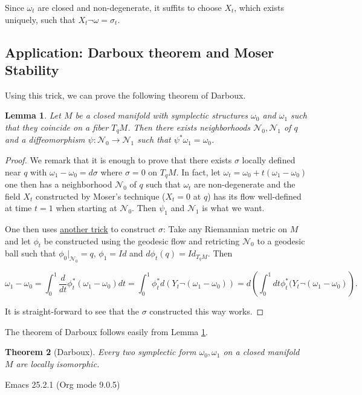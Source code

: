 \documentclass[11pt]{article}
\newtheorem{theorem}{Theorem}
\newtheorem{lemma}[theorem]{Lemma}
\begin{document}
Since \(\omega_t\) are closed and non-degenerate, it suffits to choose \(X_t\), which exists
uniquely, such that \(X_t \neg \omega = \sigma_t\).

\subsection{Application: Darboux theorem and Moser Stability}
\label{sec:orgb93185e}
Using this trick, we can prove the following theorem of Darboux.

\begin{lemma}
\label{lem1}
Let \(M\) be a closed manifold with symplectic structures \(\omega_0\) and \(\omega_1\) such
that they coincide on a fiber \(T_qM\). Then there exists neighborhoods \(\mathcal{N}_0,
\mathcal{N}_1\) of \(q\) and a diffeomorphism \(\psi: \mathcal{N}_0 \longrightarrow
\mathcal{N}_1\) such that \(\psi^* \omega_1 = \omega_0\). 
\end{lemma}


\begin{proof}
We remark that it is enough to prove that there exists \(\sigma\) locally defined near \(q\)
with \(\omega_1 -\omega_0 = d\sigma\) where \(\sigma = 0\) on \(T_qM\). In fact, let \(\omega_t =
\omega_0 + t(\omega_1 - \omega_0)\) one then has a neighborhood \(\mathcal{N}_0\) of \(q\)
such that \(\omega_t\) are non-degenerate and the field \(X_t\) constructed by Moser's
technique (\(X_t=0\) at \(q\)) has its flow well-defined at time \(t=1\) when starting at \(\mathcal{N}_0\). Then \(\psi_1\) and \(\mathcal{N}_1\) is what we want.

One then uses \uline{another trick} to construct \(\sigma\): Take any Riemannian metric on \(M\) and
let \(\phi_t\) be constructed using the geodesic flow and retricting \(\mathcal{N}_0\) to a
geodesic ball such that \(\phi_0|_{\mathcal{N}_0} = q\), \(\phi_1 = Id\) and \(d\phi_t (q) =
Id_{T_qM}\). Then

\[
\omega_1 - \omega_0 = \int_0^1 \frac{d}{dt}\phi^*_t(\omega_1 - \omega_0) dt = \int_0^1
\phi_t^* d(Y_t \neg(\omega_1 - \omega_0) )= d \left( \int_0^1 dt \phi_t^*(Y_t \neg
(\omega_1 - \omega_0) \right).
\]

It is straight-forward to see that the \(\sigma\) constructed this way works.
\end{proof}

The theorem of Darboux follows easily from Lemma \ref{lem1}.

\begin{theorem}[Darboux]
Every two symplectic form \(\omega_0, \omega_1\) on a closed manifold \(M\) are locally isomorphic.
\end{theorem}
Emacs 25.2.1 (Org mode 9.0.5)
\end{document}
